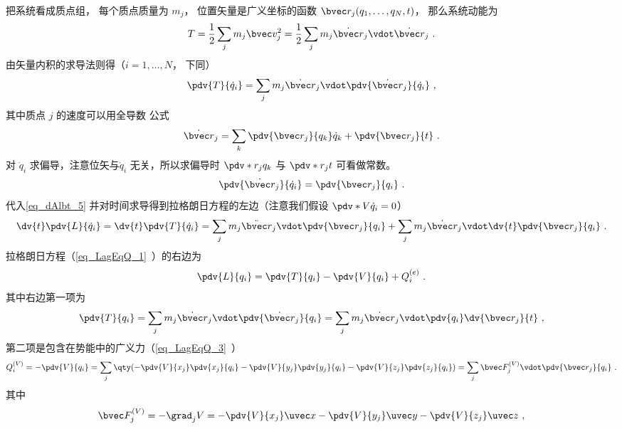 把系统看成质点组， 每个质点质量为 $m_j$， 位置矢量是广义坐标的函数 $\bvec r_j(q_1,\dots,q_N,t)$， 那么系统动能为
\begin{equation}
T = \frac12 \sum_j m_j \bvec v_j^2 = \frac12 \sum_j m_j \dot{\bvec r}_j \vdot \dot{\bvec r}_j~.
\end{equation}
由矢量内积的求导法则得（$i=1,\dots,N$， 下同）
\begin{equation}\label{eq_dAlbt_5}
\pdv{T}{\dot q_i} = \sum_j m_j \dot{\bvec r}_j \vdot \pdv{\dot{\bvec r}_j}{\dot q_i}~,
\end{equation}
其中质点 $j$ 的速度可以用全导数 公式
\begin{equation}
\dot{\bvec r}_j = \sum_k \pdv{\bvec r_j}{q_k} \dot q_k  + \pdv{\bvec r_j}{t}~.
\end{equation}
对 $\dot q_i$ 求偏导，注意位矢与$\dot q_i$ 无关，所以求偏导时 $\pdv*{r_j}{q_k}$ 与 $\pdv*{r_j}{t}$ 可看做常数。
\begin{equation}\label{eq_dAlbt_27}
\pdv{\dot{\bvec r}_j}{\dot q_i} = \pdv{\bvec r_j}{q_i}~.
\end{equation}
代入\autoref{eq_dAlbt_5} 并对时间求导得到拉格朗日方程的左边（注意我们假设 $\pdv*{V}{\dot q_i} = 0$）
\begin{equation}\label{eq_dAlbt_8}
\dv{t} \pdv{L}{\dot q_i} = \dv{t} \pdv{T}{\dot q_i} = \sum_j m_j \ddot{\bvec r}_j \vdot \pdv{\bvec r_j}{q_i}  + \sum_j m_j \dot{\bvec r}_j \vdot \dv{t} \pdv{\bvec r_j}{q_i}~.
\end{equation}
拉格朗日方程（\autoref{eq_LagEqQ_1}~）的右边为
\begin{equation}
\pdv{L}{q_i} = \pdv{T}{q_i} - \pdv{V}{q_i} + Q_i^{(e)}~.
\end{equation}
其中右边第一项为
\begin{equation}\label{eq_dAlbt_28}
\pdv{T}{q_i} = \sum_j m_j \dot{\bvec r}_j \vdot \pdv{\dot{\bvec r}_j}{q_i} = \sum_j m_j \dot{\bvec r}_j \vdot \pdv{q_i} \dv{\bvec r_j}{t}~,
\end{equation}
第二项是包含在势能中的广义力（\autoref{eq_LagEqQ_3}~）
\begin{equation}\label{eq_dAlbt_29}
Q_i^{(V)} = - \pdv{V}{q_i} = \sum_j \qty(-\pdv{V}{x_j} \pdv{x_j}{q_i} - \pdv{V}{y_j}\pdv{y_j}{q_i} - \pdv{V}{z_j} \pdv{z_j}{q_i}) = \sum_j \bvec F_j^{(V)} \vdot \pdv{\bvec r_j}{q_i}~.
\end{equation}
其中
\begin{equation}\label{eq_dAlbt_2}
\bvec F_j^{(V)} = - \grad_j V = -\pdv{V}{x_j}\uvec x - \pdv{V}{y_j}\uvec y - \pdv{V}{z_j} \uvec z~,
\end{equation}
